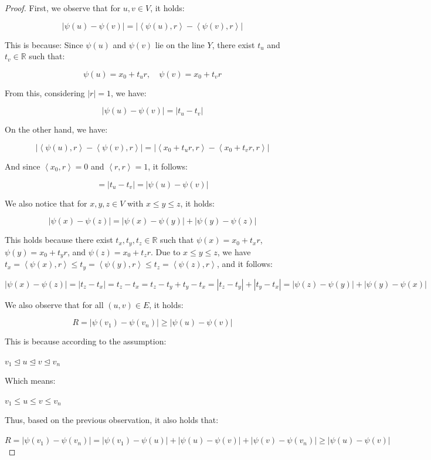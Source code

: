 \documentclass[11pt]{scrartcl}
\begin{document}
\begin{proof}
First, we observe that for $u, v \in V$, it holds:

\[
|\psi(u)-\psi(v)| = | \left < \psi(u), r\right > - \left < \psi(v), r\right >|
\]

This is because: Since $\psi(u)$ and $\psi(v)$ lie on the line $Y$, there exist $t_u$ and $t_v \in \mathbb{R}$ such that:

\[
\psi(u) = x_0 + t_u r, \quad \psi(v) = x_0 + t_v r
\]

From this, considering $|r| = 1$, we have:

\[
|\psi(u)-\psi(v)| = |t_u-t_v|
\]

On the other hand, we have:

\[
| \left < \psi(u), r\right > - \left < \psi(v), r\right >| = | \left < x_0 + t_u r, r\right > - \left < x_0 + t_v r, r\right >|
\]

And since $\left < x_0,r \right>=0$ and $\left < r,r\right> = 1$, it follows:

\[
= |t_u-t_v| = |\psi(u)-\psi(v)|
\]

We also notice that for $x, y, z \in V$ with $x \le y \le z$, it holds:

\[
|\psi(x)-\psi(z)| = |\psi(x)-\psi(y)| + |\psi(y)-\psi(z)|
\]

This holds because there exist $t_x, t_y, t_z \in \mathbb{R}$ such that $\psi(x) = x_0 + t_x r$, $\psi(y) = x_0 + t_y r$, and $\psi(z) = x_0 + t_z r$. Due to $x \le y \le z$, we have $t_x = \left < \psi(x) , r\right > \le t_y = \left < \psi(y) , r \right> \le t_z = \left < \psi(z), r \right >$, and it follows:

\[
|\psi(x)-\psi(z)| = |t_z-t_x| = t_z - t_x = t_z -t_y+t_y-t_x = |t_z-t_y| + |t_y-t_x| = |\psi(z)-\psi(y)| + |\psi(y)-\psi(x)|
\]

We also observe that for all $(u,v) \in E$, it holds:

\[
R = |\psi(v_1)-\psi(v_n)| \ge | \psi(u)-\psi(v)|
\]

This is because according to the assumption:

$v_1 \trianglelefteq u \trianglelefteq v \trianglelefteq v_n$

Which means:

$v_1 \le u \le v \le v_n$

Thus, based on the previous observation, it also holds that:

$R = |\psi(v_1)-\psi(v_n)| = |\psi(v_1)-\psi(u)| + |\psi(u)-\psi(v)|+|\psi(v)-\psi(v_n)| \ge |\psi(u)-\psi(v)|$


\end{proof}
\end{document}
